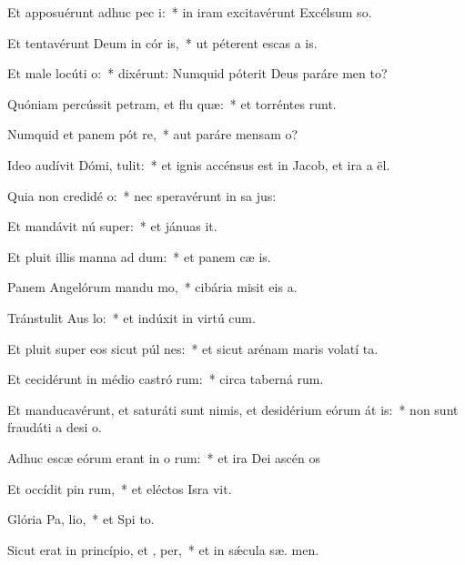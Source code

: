 \item Et apposuérunt adhuc pec i:~* in iram excitavérunt Excélsum  so.
\item Et tentavérunt Deum in cór is,~* ut péterent escas a is.
\item Et male locúti   o:~* dixérunt: Numquid póterit Deus paráre men  to?
\item Quóniam percússit petram, et flu quæ:~* et torréntes runt.
\item Numquid et panem pót re,~* aut paráre mensam  o?
\item Ideo audívit Dómi,  tulit:~* et ignis accénsus est in Jacob, et ira a  ël.
\item Quia non credidé  o:~* nec speravérunt in sa jus:
\item Et mandávit nú super:~* et jánuas  it.
\item Et pluit illis manna ad dum:~* et panem cæ  is.
\item Panem Angelórum mandu mo,~* cibária misit eis  a.
\item Tránstulit Aus  lo:~* et indúxit in virtú  cum.
\item Et pluit super eos sicut púl nes:~* et sicut arénam maris volatí ta.
\item Et cecidérunt in médio castró rum:~* circa taberná rum.
\item Et manducavérunt, et saturáti sunt nimis, et desidérium eórum át is:~* non sunt fraudáti a desi o.
\item Adhuc escæ eórum erant in o rum:~* et ira Dei ascén  os
\item Et occídit pin rum,~* et eléctos Isra vit.
\item Glória Pa,  lio,~* et Spi to.
\item Sicut erat in princípio, et ,  per,~* et in sǽcula sæ. men.
